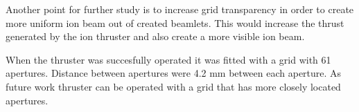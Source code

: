 Another point for further study is to increase grid transparency in order to create more uniform ion beam out of created beamlets. This would increase the thrust generated by the ion thruster and also create a more visible ion beam. 

When the thruster was succesfully operated it was fitted with a grid with 61 apertures. Distance between apertures were 4.2 mm between each aperture. As future work thruster can be operated with a grid that has more closely located apertures. 












